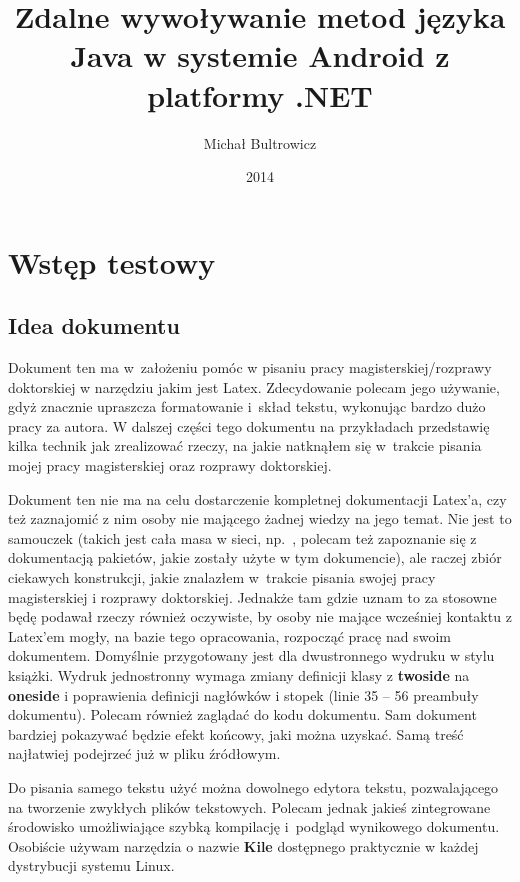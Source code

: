 \documentclass[twoside,a4paper]{book}
\title{Zdalne wywoływanie metod języka Java w systemie Android z platformy .NET}
\author{Michał Bultrowicz}
\date{2014}
\begin{document}
\frontmatter
\maketitle

\tableofcontents

\mainmatter

\chapter{Wstęp testowy}
\section{Idea dokumentu}

Dokument ten ma w~założeniu pomóc w pisaniu pracy magisterskiej/rozprawy doktorskiej w narzędziu jakim jest Latex. Zdecydowanie polecam jego używanie, gdyż znacznie upraszcza formatowanie i~skład tekstu, wykonując bardzo dużo pracy za autora. W dalszej części tego dokumentu na przykładach przedstawię kilka technik jak zrealizować rzeczy, na jakie natknąłem się w~trakcie pisania mojej pracy magisterskiej oraz rozprawy doktorskiej.

Dokument ten nie ma na celu dostarczenie kompletnej dokumentacji Latex'a, czy też zaznajomić z nim osoby nie mającego żadnej wiedzy na jego temat. Nie jest to samouczek (takich jest cała masa w sieci, np.~\cite{wikibooks}, polecam też zapoznanie się z dokumentacją pakietów, jakie zostały użyte w tym dokumencie), ale raczej zbiór ciekawych konstrukcji, jakie znalazłem w~trakcie pisania swojej pracy magisterskiej i rozprawy doktorskiej. Jednakże tam gdzie uznam to za stosowne będę podawał rzeczy również oczywiste, by osoby nie mające wcześniej kontaktu z Latex'em mogły, na bazie tego opracowania, rozpocząć pracę nad swoim dokumentem. Domyślnie przygotowany jest dla dwustronnego wydruku w stylu książki. Wydruk jednostronny wymaga zmiany definicji klasy z \textbf{twoside} na \textbf{oneside} i poprawienia definicji nagłówków i stopek (linie 35 -- 56 preambuły dokumentu). Polecam również zaglądać do kodu dokumentu. Sam dokument bardziej pokazywać będzie efekt końcowy, jaki można uzyskać. Samą treść najłatwiej podejrzeć już w pliku źródłowym.

Do pisania samego tekstu użyć można dowolnego edytora tekstu, pozwalającego na tworzenie zwykłych plików tekstowych. Polecam jednak jakieś zintegrowane środowisko umożliwiające szybką kompilację i~podgląd wynikowego dokumentu. Osobiście używam narzędzia o nazwie \textbf{Kile} dostępnego praktycznie w każdej dystrybucji systemu Linux.
\end{document}
